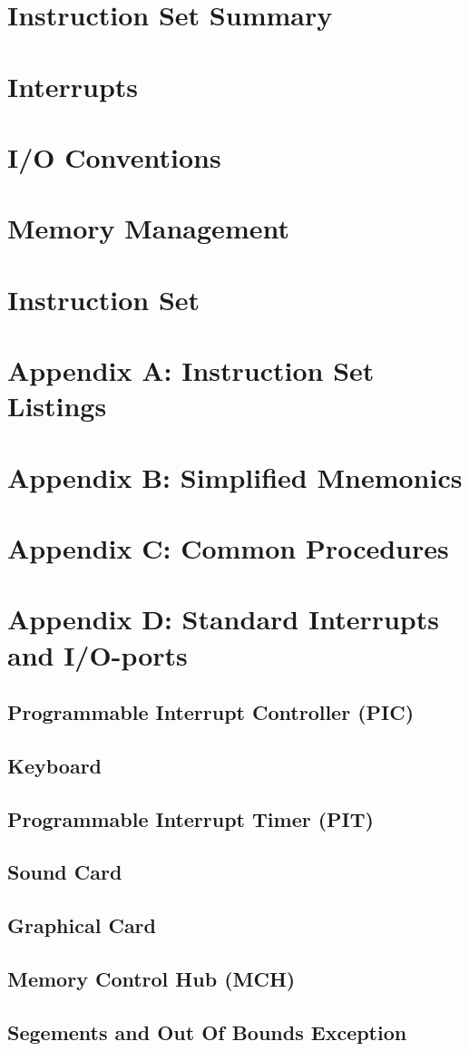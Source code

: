 \documentclass[twoside,a4paper]{memoir}
\begin{document}
\chapter{Instruction Set Summary}

\chapter{Interrupts}

\chapter{I/O Conventions}

\chapter{Memory Management}

\chapter{Instruction Set}

\chapter{Appendix A: Instruction Set Listings}

\chapter{Appendix B: Simplified Mnemonics}

\chapter{Appendix C: Common Procedures}

\chapter{Appendix D: Standard Interrupts and I/O-ports}
\section{Programmable Interrupt Controller (PIC)}
\section{Keyboard}
\section{Programmable Interrupt Timer (PIT)}
\section{Sound Card}
\section{Graphical Card}
\section{Memory Control Hub (MCH)}
\section{Segements and Out Of Bounds Exception}
\end{document}
